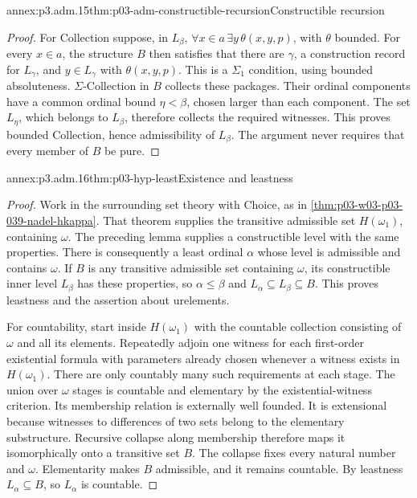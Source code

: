 \begin{annexitem}{annex:p3.adm.15}{thm:p03-adm-constructible-recursion}{Constructible recursion}
\begin{proof}
For Collection suppose, in \(L_\beta\),
\(\forall x\in a\,\exists y\,\theta(x,y,p)\), with \(\theta\)
bounded. For every \(x\in a\), the structure \(B\) then satisfies
that there are \(\gamma\), a construction record for \(L_\gamma\),
and \(y\in L_\gamma\) with \(\theta(x,y,p)\). This is a
\(\Sigma_1\) condition, using bounded absoluteness.
\(\Sigma\)-Collection in \(B\) collects these packages. Their
ordinal components have a common ordinal bound \(\eta<\beta\),
chosen larger than each component. The set \(L_\eta\), which belongs
to \(L_\beta\), therefore collects the required witnesses. This
proves bounded Collection, hence admissibility of \(L_\beta\).
The argument never requires that every member of \(B\) be pure.
\end{proof}
\end{annexitem}

\begin{annexitem}{annex:p3.adm.16}{thm:p03-hyp-least}{Existence and leastness}
\begin{proof}
Work in the surrounding set theory with Choice, as in
\cref{thm:p03-w03-p03-039-nadel-hkappa}. That theorem supplies the
transitive admissible set \(H(\omega_1)\), containing \(\omega\).
The preceding lemma supplies a constructible level with the same
properties. There is consequently a least ordinal \(\alpha\)
whose level is admissible and contains \(\omega\).
If \(B\) is any transitive admissible set containing \(\omega\),
its constructible inner level \(L_\beta\) has these properties, so
\(\alpha\leq\beta\) and \(L_\alpha\subseteq L_\beta\subseteq B\).
This proves leastness and the assertion about urelements.

For countability, start inside \(H(\omega_1)\) with the countable
collection consisting of \(\omega\) and all its elements. Repeatedly
adjoin one witness for each first-order existential formula with
parameters already chosen whenever a witness exists in
\(H(\omega_1)\). There are only countably many such requirements
at each stage. The union over \(\omega\) stages is countable and
elementary by the existential-witness criterion. Its membership
relation is externally well founded. It is extensional because
witnesses to differences of two sets belong to the elementary
substructure. Recursive collapse along membership therefore maps it
isomorphically onto a transitive set \(B\). The collapse fixes every
natural number and \(\omega\). Elementarity makes \(B\)
admissible, and it remains countable. By leastness
\(L_\alpha\subseteq B\), so \(L_\alpha\) is countable.
\end{proof}
\end{annexitem}

